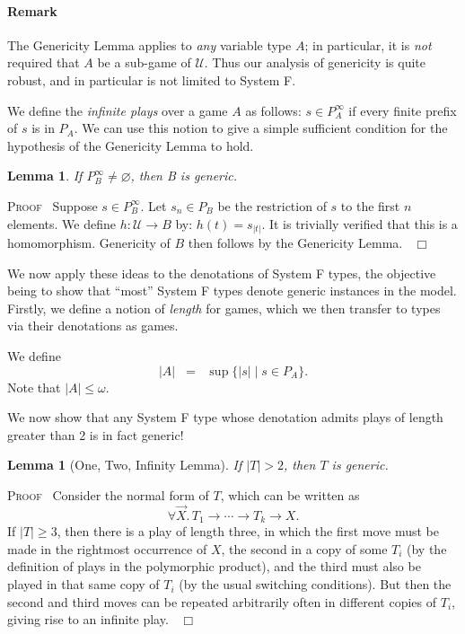 \documentclass[a4paper,11pt]{article}
\newcommand{\UU}{\mathcal{U}}
\newtheorem{lemma}[proposition]{Lemma}
\newenvironment{proof}{\textsc{Proof}\ }{$\;\; \Box$}
\begin{document}
\paragraph{Remark} The Genericity Lemma applies to \emph{any} variable
type $A$; in particular, it is \emph{not} required that $A$ be a
sub-game of $\UU$. Thus our analysis of genericity is quite robust,
and in particular is not limited to System F.

We define the \emph{infinite plays} over a game $A$ as follows:
$s \in P_A^{\infty}$ if every finite prefix of $s$ is in $P_A$.
We can use this notion to give a simple sufficient condition for the
hypothesis of the Genericity Lemma to hold.
\begin{lemma}
If $P_B^{\infty} \neq \varnothing$, then B is generic.
\end{lemma}
\begin{proof}
Suppose $s \in P_B^{\infty}$. Let $s_n \in P_B$ be the restriction of
$s$ to the first $n$ elements. We define $h : \UU \longrightarrow B$
by: $h(t) = s_{|t|}$. It is trivially verified that this is a
homomorphism. Genericity of $B$ then follows by the Genericity Lemma.
\end{proof}

We now apply these ideas to the denotations of System F types, the
objective being to show that ``most'' System F types denote generic
instances in the model.
Firstly, we define a notion of \emph{length} for games, which we then
transfer to types via their denotations as games.

\noindent We define
\[ |A| \;\; = \;\; \sup \{ |s| \mid s \in P_A \} . \]
Note that $|A| \leq \omega$.

We now show that any System F type whose denotation admits plays of
length greater than 2 is in fact generic!

\begin{lemma}[One, Two, Infinity  Lemma]
If $|T| > 2$, then $T$ is generic.
\end{lemma}
\begin{proof}
Consider the normal form of $T$, which can be written as
\[ \forall \vec{X}. \, T_1 \rightarrow \cdots \rightarrow T_k
\rightarrow X . \]
If $|T| \geq 3$, then there is a play of length three, in which the
first move must be made in the rightmost occurrence of $X$, the second
in a copy of some $T_i$ (by the definition of plays in the polymorphic product),
and the third must also be played in that same copy of $T_i$ (by the usual
switching conditions). But then the second and third moves can be
repeated arbitrarily often in different copies of $T_i$, giving rise
to an infinite play.
\end{proof}
\end{document}

